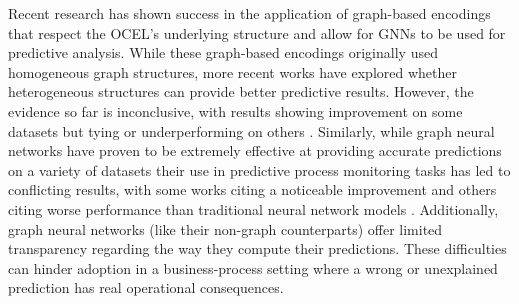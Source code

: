 Recent research has shown success in the application of graph-based encodings that respect the OCEL's underlying structure \cite{adams2022} and allow for GNNs to be used for predictive analysis. While these graph-based encodings originally used homogeneous graph structures, more recent works have explored whether heterogeneous structures can provide better predictive results. However, the evidence so far is inconclusive, with results showing improvement on some datasets but tying or underperforming on others \cite{smit2024} \cite{deleonieVolpato}. Similarly, while graph neural networks have proven to be extremely effective at providing accurate predictions on a variety of datasets their use in predictive process monitoring tasks has led to conflicting results, with some works citing a noticeable improvement \cite{adams2022} and others citing worse performance than traditional neural network models \cite{galantiDeleoni2024}. Additionally, graph neural networks (like their non-graph counterparts) offer limited transparency regarding the way they compute their predictions. These difficulties can hinder adoption in a business-process setting where a wrong or unexplained prediction has real operational consequences.

